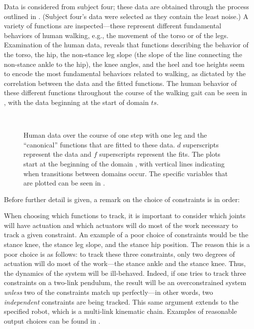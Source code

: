 Data is considered from subject four; these data are obtained through the
process outlined in .
%
(Subject four's data were selected as they contain the least noise.)
%
A variety of functions are inspected---these represent different fundamental
behaviors of human walking, e.g., the movement of the torso or of the legs.
%
Examination of the human data, reveals that functions describing the behavior of
the torso, the hip, the non-stance leg slope (the slope of the line connecting
the non-stance ankle to the hip), the knee angles, and the heel and toe heights
seem to encode the most fundamental behaviors related to walking, as dictated by
the correlation between the data and the fitted functions.
%
The human behavior of these different functions throughout the course of the
walking gait can be seen in , with the data
beginning at the start of domain $ts$.

\begin{figure}[ht!]
  \centering
  \\
  \caption{Human data over the course of one step with one leg and the
    ``canonical'' functions that are fitted to these data.
    $d$ superscripts represent the data and $f$ superscripts represent the fits.
    The plots start at the beginning of the domain {\DA}, with vertical lines
    indicating when transitions between domains occur.
    The specific variables that are plotted can be seen in
    .}
  \label{fig:constraints-fitting}
\end{figure}

Before further detail is given, a remark on the choice of constraints is in
order:
%
\begin{remark} \label{rmk:actuation}
  When choosing which functions to track, it is important to consider which
  joints will have actuation and which actuators will do most of the work
  necessary to track a given constraint.
  An example of a poor choice of constraints would be the stance knee, the
  stance leg slope, and the stance hip position.
  The reason this is a poor choice is as follows:
  to track these three constraints, only two degrees of actuation will do most
  of the work---the stance ankle and the stance knee.
  Thus, the dynamics of the system will be ill-behaved.
  Indeed, if one tries to track three constraints on a two-link pendulum, the
  result will be an overconstrained system {\em unless} two of the constraints
  match up perfectly---in other words, two {\em independent} constraints are
  being tracked.
  This same argument extends to the specified robot, which is a multi-link
  kinematic chain.
  Examples of reasonable output choices can be found in \cite{Sinnet2014}.
\end{remark}


